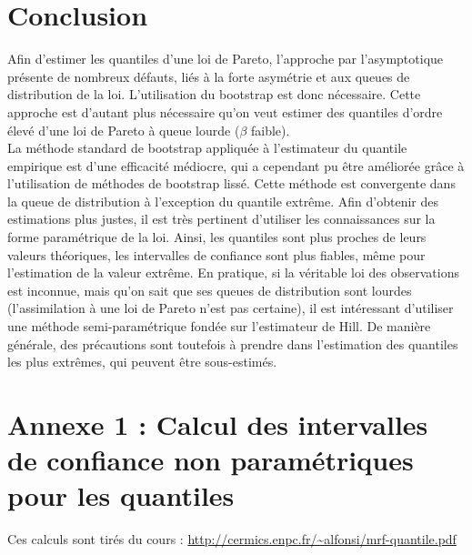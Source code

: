 \documentclass{article}
\renewcommand*{\(}{ \left( }
\renewcommand*{\)}{ \right) }
\begin{document}



\clearpage
\section*{Conclusion}

Afin d'estimer les quantiles d'une loi de Pareto, l'approche par l'asymptotique présente de nombreux défauts, liés à la forte asymétrie et aux queues de distribution de la loi. L'utilisation du bootstrap est donc nécessaire. Cette approche est d'autant plus nécessaire qu'on veut estimer des quantiles d'ordre élevé d'une loi de Pareto à queue lourde ($\beta$ faible).\\

La méthode standard de bootstrap appliquée à l'estimateur du quantile empirique est d'une efficacité médiocre, qui a cependant pu être améliorée grâce à l'utilisation de méthodes de bootstrap lissé. Cette méthode est convergente dans la queue de distribution à l'exception du quantile extrême. Afin d'obtenir des estimations plus justes, il est très pertinent d'utiliser les connaissances sur la forme paramétrique de la loi. Ainsi, les quantiles sont plus proches de leurs valeurs théoriques, les intervalles de confiance sont plus fiables, même pour l'estimation de la valeur extrême. En pratique, si la véritable loi des observations est inconnue, mais qu'on sait que ses queues de distribution sont lourdes (l'assimilation à une loi de Pareto n'est pas certaine), il est intéressant d'utiliser une méthode semi-paramétrique fondée sur l'estimateur de Hill. De manière générale, des précautions sont toutefois à prendre dans l'estimation des quantiles les plus extrêmes, qui peuvent être sous-estimés.

\clearpage



\section*{Annexe 1 : Calcul des intervalles de confiance non paramétriques pour les quantiles}
Ces calculs sont tirés du cours :
\url{http://cermics.enpc.fr/~alfonsi/mrf-quantile.pdf}\\
\end{document}
